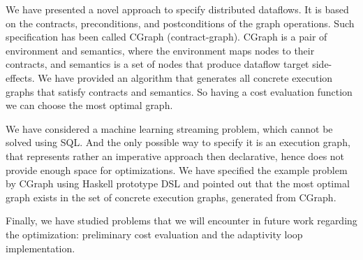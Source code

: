 We have presented a novel approach to specify distributed dataflows.
It is based on the contracts, preconditions, and postconditions of the graph operations.
Such specification has been called CGraph (contract-graph).
CGraph is a pair of environment and semantics, where the environment maps nodes to their contracts, and semantics is a set of nodes that produce dataflow target side-effects.
We have provided an algorithm that generates all concrete execution graphs that satisfy contracts and semantics.
So having a cost evaluation function we can choose the most optimal graph.

We have considered a machine learning streaming problem, which cannot be solved using SQL. %
And the only possible way to specify it is an execution graph, that represents rather an imperative approach then declarative, hence does not provide enough space for optimizations.
We have specified the example problem by CGraph using Haskell prototype DSL and pointed out that the most optimal graph exists in the set of concrete execution graphs, generated from CGraph.

Finally, we have studied problems that we will encounter in future work regarding the optimization: preliminary cost evaluation and the adaptivity loop implementation.
